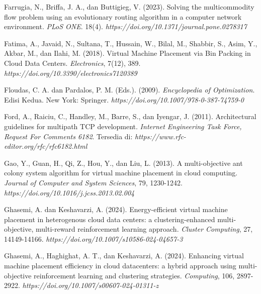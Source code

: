 \begin{thebibliography}{99}
	

	Farrugia, N., Briffa, J. A., dan Buttigieg, V. (2023). Solving the multicommodity flow problem using an evolutionary routing algorithm in a computer network environment. \textit{PLoS ONE}. 18(4). \textit{https://doi.org/10.1371/journal.pone.0278317}

  
  
  
	Fatima, A., Javaid, N., Sultana, T., Hussain, W., Bilal, M., Shabbir, S., Asim, Y., Akbar, M., dan Ilahi, M. (2018). Virtual Machine Placement via Bin Packing in Cloud Data Centers. \textit{Electronics}, 7(12), 389. \textit{https://doi.org/10.3390/electronics7120389} 
	

	
	

	Floudas, C. A. dan Pardalos, P. M. (Eds.). (2009). \textit{Encyclopedia of Optimization}. Edisi Kedua. New York: Springer. \textit{https://doi.org/10.1007/978-0-387-74759-0}
	
	

	Ford, A., Raiciu, C., Handley, M., Barre, S., dan Iyengar, J. (2011). Architectural guidelines for multipath TCP development. \textit{Internet Engineering Task Force, Request For Comments 6182}. Tersedia di: \textit{https://www.rfc-editor.org/rfc/rfc6182.html}
	


	Gao, Y., Guan, H., Qi, Z., Hou, Y., dan Liu, L. (2013). A multi-objective ant colony system algorithm for virtual machine placement in cloud computing. \textit{Journal of Computer and System Sciences}, 79, 1230-1242. \textit{https://doi.org/10.1016/j.jcss.2013.02.004}	



	Ghasemi, A. dan Keshavarzi, A. (2024). Energy-efficient virtual machine placement in heterogenous cloud data centers: a clustering-enhanced multi-objective, multi-reward reinforcement learning approach. \textit{Cluster Computing}, 27, 14149-14166. \textit{https://doi.org/10.1007/s10586-024-04657-3}
	
	

	Ghasemi, A., Haghighat, A. T., dan Keshavarzi, A. (2024). Enhancing virtual machine placement efficiency in cloud datacenters: a hybrid approach using multi-objective reinforcement learning and clustering strategies. \textit{Computing}, 106, 2897-2922. \textit{https://doi.org/10.1007/s00607-024-01311-z}
	

\end{thebibliography}
